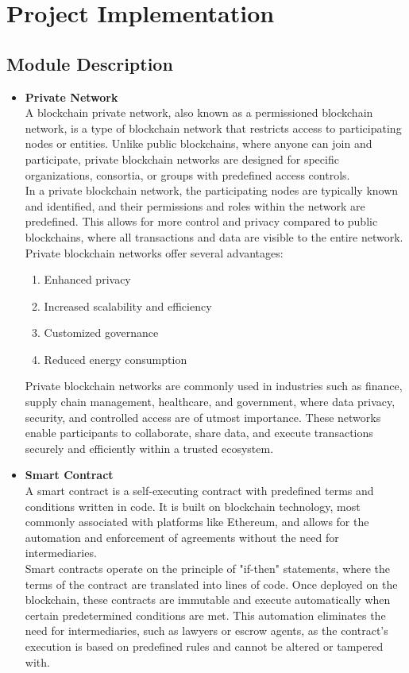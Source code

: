 \documentclass[oneside, 12pt]{book}
\begin{document}
	\section{Project Implementation}
	\newpage
		\subsection{Module Description}
			\begin{itemize}
				\item\textbf{Private Network}
					\\A blockchain private network, also known as a permissioned blockchain network, is a type of blockchain network that restricts access to participating nodes or entities. Unlike public blockchains, where anyone can join and participate, private blockchain networks are designed for specific organizations, consortia, or groups with predefined access controls.
					\\In a private blockchain network, the participating nodes are typically known and identified, and their permissions and roles within the network are predefined. This allows for more control and privacy compared to public blockchains, where all transactions and data are visible to the entire network.
					\\Private blockchain networks offer several advantages:
					\begin{enumerate}
						\item Enhanced privacy
						\item Increased scalability and efficiency
						\item Customized governance
						\item Reduced energy consumption
					\end{enumerate}
					Private blockchain networks are commonly used in industries such as finance, supply chain management, healthcare, and government, where data privacy, security, and controlled access are of utmost importance. These networks enable participants to collaborate, share data, and execute transactions securely and efficiently within a trusted ecosystem.
				\item\textbf{Smart Contract}
					\\A smart contract is a self-executing contract with predefined terms and conditions written in code. It is built on blockchain technology, most commonly associated with platforms like Ethereum, and allows for the automation and enforcement of agreements without the need for intermediaries.
					\\Smart contracts operate on the principle of "if-then" statements, where the terms of the contract are translated into lines of code. Once deployed on the blockchain, these contracts are immutable and execute automatically when certain predetermined conditions are met. This automation eliminates the need for intermediaries, such as lawyers or escrow agents, as the contract's execution is based on predefined rules and cannot be altered or tampered with.

\end{itemize}
\end{document}

